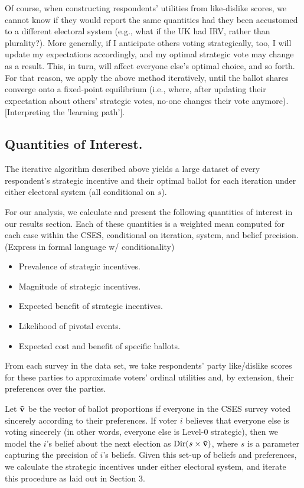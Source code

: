 \documentclass[12pt, letter]{article}
\begin{document}
Of course, when constructing respondents' utilities from like-dislike scores, we cannot know if they would report the same quantities had they been accustomed to a different electoral system (e.g., what if the UK had IRV, rather than plurality?). More generally, if I anticipate others voting strategically, too, I will update my expectations accordingly, and my optimal strategic vote may change as a result. This, in turn, will affect everyone else's optimal choice, and so forth. For that reason, we apply the above method iteratively, until the ballot shares converge onto a fixed-point equilibrium (i.e., where, after updating their expectation about others' strategic votes, no-one changes their vote anymore). [Interpreting the 'learning path'].

\subsection{Quantities of Interest.}

The iterative algorithm described above yields a large dataset of every respondent's strategic incentive and their optimal ballot for each iteration under either electoral system (all conditional on $s$).

For our analysis, we calculate and present the following quantities of interest in our results section. Each of these quantities is a weighted mean computed for each case within the CSES, conditional on iteration, system, and belief precision. (Express in formal language w/ conditionality)

\begin{itemize}
	\item Prevalence of strategic incentives.
	\item Magnitude of strategic incentives.
	\item Expected benefit of strategic incentives.
	\item Likelihood of pivotal events.
	\item Expected cost and benefit of specific ballots.
\end{itemize}


From each survey in the data set, we take respondents' party like/dislike scores for these parties to approximate voters' ordinal utilities and, by extension, their preferences over the parties.

Let $\bf \tilde{v}$ be the vector of ballot proportions if everyone in the CSES survey voted sincerely according to their preferences. If voter $i$ believes that everyone else is voting sincerely (in other words, everyone else is Level-0 strategic), then we model the $i$'s belief about the next election as $\text{Dir}(s \times \bf \tilde{v})$, where $s$ is a parameter capturing the precision of $i$'s beliefs. Given this set-up of beliefs and preferences, we calculate the strategic incentives under either electoral system, and iterate this procedure as laid out in Section 3.
\end{document}
